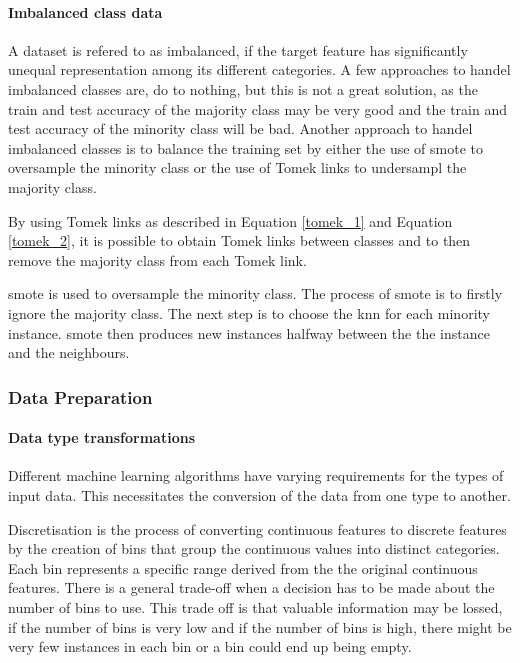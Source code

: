 \documentclass[10pt, conference]{IEEEtran}
\begin{document}
\paragraph{Imbalanced class data}

A dataset is refered to as imbalanced, if the target feature has significantly unequal
representation among its different categories. A few approaches to handel imbalanced classes are, do to
nothing, but this is not a great solution, as the train and test accuracy of the majority class may be
very good and the train and test accuracy of the minority class will be bad. Another approach to
handel imbalanced classes is to balance the training set by either the use of \acrfull{smote}
to oversample the minority class or the use of Tomek links to undersampl the majority class.

By using Tomek links as described in Equation \eqref{tomek_1} and Equation \eqref{tomek_2}, it is possible
to obtain Tomek links between classes and to then remove the majority class from each Tomek link.

\acrshort{smote} is used to oversample the minority class. The process of \acrshort{smote} is to
firstly ignore the majority class. The next step is to choose the \acrshort{knn} for each minority
instance. \acrshort{smote} then produces new instances halfway between the the instance and the
neighbours.

\subsubsection{Data Preparation}

\paragraph{Data type transformations}

Different machine learning algorithms have varying requirements for the types of input data. This necessitates
the conversion of the data from one type to another.

Discretisation is the process of converting continuous features to discrete features by the creation of bins
that group the continuous values into distinct categories. Each bin represents a specific range derived from the
the original continuous features. There is a general trade-off when a decision has to be made about the number of
bins to use. This trade off is that valuable information may be lossed, if the number of bins is very low and
if the number of bins is high, there might be very few instances in each bin or a bin could end up being empty.
\end{document}
